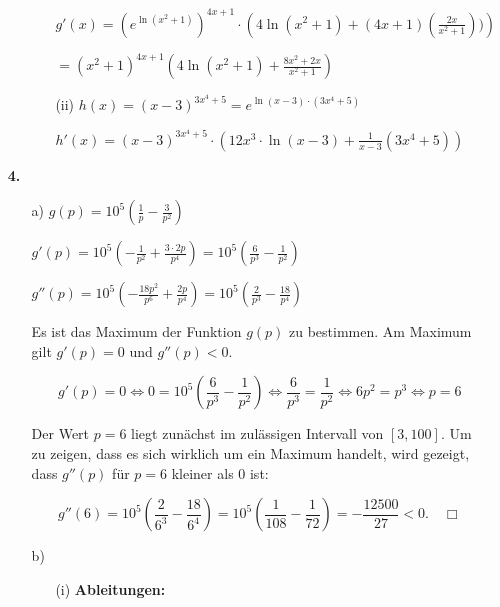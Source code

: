 \documentclass[a4paper,11pt]{scrartcl}
\newcommand{\bra}[1]{\left(#1\right)}
\newcommand{\step}[1]{\textbf{#1}}
\begin{document}
\begin{enumerate}
\begin{enumerate}
\begin{enumerate}
                \( g'(x) = \bra{e^{\ln\bra{x^2 + 1}}}^{4x + 1} \cdot \bra{ 4 \ln\bra{x^2+1} + \bra{4x+1}\bra{\frac{2x}{x^2+1}}) } \)

                \( = \bra{x^2+1}^{4x+1} \bra{4\ln\bra{x^2+1} + \frac{8x^2+2x}{x^2+1} } \)

            \item[(ii)]
                \( h(x) = \bra{x-3}^{3x^4 + 5} = e^{\ln\bra{x-3} \cdot \bra{3x^4 + 5}} \)

                \( h'(x) = \bra{x-3}^{3x^4+5} \cdot \bra{ 12x^3 \cdot \ln\bra{x-3} + \frac{1}{x-3}\bra{3x^4 + 5} } \)

        \end{enumerate}

    \end{enumerate}

    \newpage
    \item[\textbf{4.}]
    \begin{enumerate}
        \item[a)]
            \( g(p) = 10^5 \bra{\frac{1}{p} - \frac{3}{p^2}} \)

            \( g'(p) = 10^5 \bra{-\frac{1}{p^2} + \frac{3 \cdot 2p}{p^4}} = 10^5 \bra{\frac{6}{p^3} - \frac{1}{p^2}} \)

            \( g''(p) = 10^5 \bra{-\frac{18 p^2}{p^6} + \frac{2p}{p^4}} = 10^5 \bra{\frac{2}{p^3} - \frac{18}{p^4}} \)

            Es ist das Maximum der Funktion $g(p)$ zu bestimmen. Am Maximum gilt $g'(p) = 0$ und $g''(p) < 0$.

            \[ g'(p) = 0
            \Leftrightarrow 0 = 10^5 \bra{\frac{6}{p^3} - \frac{1}{p^2}}
            \Leftrightarrow \frac{6}{p^3} = \frac{1}{p^2}
            \Leftrightarrow 6p^2 = p^3
            \Leftrightarrow p = 6 \]

            Der Wert $p=6$ liegt zunächst im zulässigen Intervall von $[3, 100]$.
            Um zu zeigen, dass es sich wirklich um ein Maximum handelt, wird gezeigt,
            dass $g''(p)$ für $p = 6$ kleiner als $0$ ist:

            \[ g''(6) = 10^5 \bra{\frac{2}{6^3} - \frac{18}{6^4}} = 10^5 \bra{\frac{1}{108} - \frac{1}{72}} = - \frac{12500}{27} < 0.
            \hspace{1em} \Box \]

        \item[b)]
        \begin{enumerate}
            \item[(i)]
                \step{Ableitungen:}


\end{enumerate}
\end{enumerate}
\end{enumerate}
\end{document}
